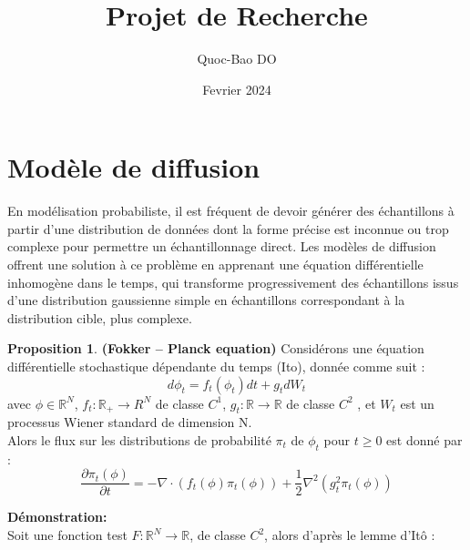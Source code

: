 \documentclass{article}
\title{Projet de Recherche}
\author{Quoc-Bao DO}
\date{Fevrier 2024}
\theoremstyle{definition} %
\theoremstyle{definition} %
\newtheorem{proposition}[definition]{Proposition}
\theoremstyle{definition} %
\theoremstyle{definition} %
\begin{document}
\maketitle

\section{Modèle de diffusion}

    En modélisation probabiliste, il est fréquent de devoir générer des échantillons à partir d'une distribution de données dont la forme précise est inconnue ou trop complexe pour permettre un échantillonnage direct. Les modèles de diffusion offrent une solution à ce problème en apprenant une équation différentielle inhomogène dans le temps, qui transforme progressivement des échantillons issus d'une distribution gaussienne simple en échantillons correspondant à la distribution cible, plus complexe.
\begin{proposition}
    \textbf{(Fokker – Planck equation)} Considérons une équation différentielle stochastique dépendante du temps (Ito), donnée comme suit :
    \begin{equation}
         d\phi_t = f_t(\phi_t)dt + g_tdW_t
    \end{equation}
    avec $\phi \in \mathbb{R}^N$, $f_t:\mathbb{R_+} \rightarrow R^N$ de classe $C^1$, $g_t : \mathbb{R} \rightarrow \mathbb{R}$ de classe $C^2$ , et $W_t$ est un processus Wiener standard de dimension N.\\
    Alors le flux sur les distributions de probabilité $\pi_t$ de $\phi_t$ pour $t \geq 0$ est donné par :
    \begin{equation}
        \frac{\partial\pi_t(\phi)}{\partial t} = -\nabla \cdot (f_t(\phi) \pi_t(\phi)) + \frac{1}{2}\nabla^2(g_t^2\pi_t(\phi))
    \end{equation}
\end{proposition}

\textbf{Démonstration:}\\

Soit une fonction test $F: \mathbb{R}^N \rightarrow \mathbb{R}$, de classe $C^2$, alors d'après le lemme d’Itô :
\end{document}
